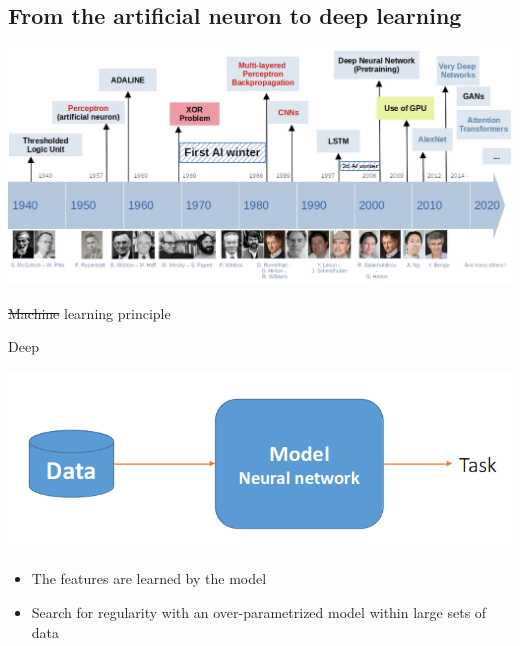 \documentclass[usenames,dvipsnames]{beamer}
\begin{document}
    \subsection[DL history]{From the artificial neuron to deep learning}
    \begin{frame}{\secname}{\subsecname}
        \begin{center}
            \includegraphics[width=\linewidth]{figures/DL_fundamentals/DL_history_mik.png}
        \end{center}
    \end{frame}
    
    \begin{frame}{\secname}{\subsecname}
        \sout{Machine} learning principle
        
        \alert{Deep}
        \begin{center}
            \includegraphics[width=0.82\linewidth]{figures/Context/DL_principle.png}
        \end{center}
        \begin{itemize}
            \item The features are learned by the model
            \item Search for regularity with an over-parametrized model within large sets of data
        \end{itemize}
    \end{frame}
    
\end{document}

